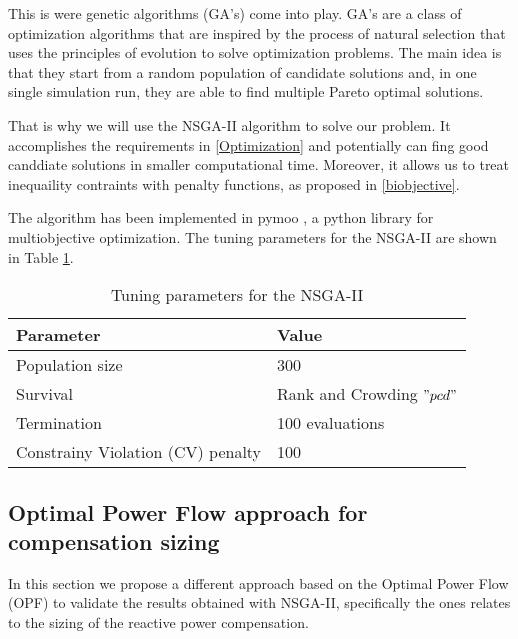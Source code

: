 \documentclass[a4paper,11pt, titlepage, twoside]{article}
\begin{document}
This is were genetic algorithms (GA's) come into play. GA's are a class of optimization algorithms that are inspired by the process of natural selection that uses the principles of evolution to solve optimization problems. The main idea is that they start from a random
population of candidate solutions and, in one single simulation run, they are able to find multiple Pareto optimal solutions. \par

That is why we will use the NSGA-II algorithm \cite{NSGAII} to solve our problem. It accomplishes the requirements in \ref{Optimization} and potentially
can fing good canddiate solutions in smaller computational time. Moreover, it allows us to treat inequaility contraints with penalty functions, as proposed in \ref{biobjective}.\par



The algorithm has been implemented in pymoo \cite{pymoo}, a python library for multiobjective optimization. The tuning parameters for the NSGA-II are shown in Table \ref{tab:NSGAII_parameters}.

\begin{table}[h]
    \centering
    \begin{tabular}{l|l}
    \hline
    \textbf{Parameter} & \textbf{Value} \\ \hline
    Population size & 300 \\ \hline
    Survival & Rank and Crowding $"pcd"$ \\ \hline
    Termination  & 100 evaluations \\ \hline
    Constrainy Violation (CV) penalty & 100 \\ \hline
    \end{tabular}
    \caption{Tuning parameters for the NSGA-II}
    \label{tab:NSGAII_parameters}
    \end{table}



\subsection{Optimal Power Flow approach for compensation sizing}

In this section we propose a different approach based on the Optimal Power Flow (OPF) to validate the results obtained with NSGA-II, specifically the ones relates to
the sizing of the reactive power compensation.\par 
\end{document}
